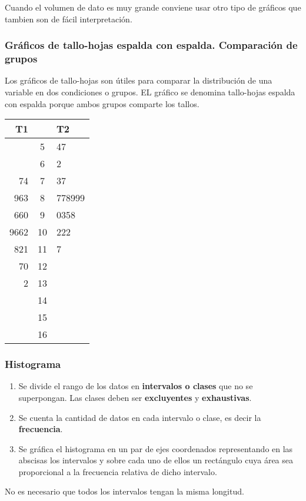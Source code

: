 Cuando el volumen de dato es muy grande conviene usar otro tipo de gráficos que tambien son de fácil interpretación.

\subsubsection{Gráficos de tallo-hojas espalda con espalda. Comparación de grupos}
Los gráficos de tallo-hojas son útiles para comparar la distribución de una variable en dos condiciones o grupos. EL gráfico se denomina tallo-hojas espalda con espalda porque ambos grupos comparte los tallos.

\begin{center}
\begin{tabular}{r|c|l}
\textbf{T1} & & \textbf{T2} \\
\hline
	&5 & 47\\
	&6 & 2\\
	74 &7 & 37\\
	963 &8 & 778999\\
	660 &9 & 0358\\
	9662 &10 & 222\\
	821 &11 & 7\\
	70 &12 & \\
	2 &13 & \\
	&14 & \\
	&15 & \\
	&16 & \\
\end{tabular}
\end{center}

\subsubsection{Histograma}
\begin{enumerate}
	\item Se divide el rango de los datos en \textbf{intervalos o clases} que no se superpongan. Las clases deben ser \textbf{excluyentes} y \textbf{exhaustivas}.
	\item Se cuenta la cantidad de datos en cada intervalo o clase, es decir la \textbf{frecuencia}.
	\item Se gráfica el histograma en un par de ejes coordenados representando en las abscisas los intervalos y sobre cada uno de ellos un rectángulo cuya área sea proporcional a la frecuencia relativa de dicho intervalo.
\end{enumerate}
No es necesario que todos los intervalos tengan la misma longitud.

